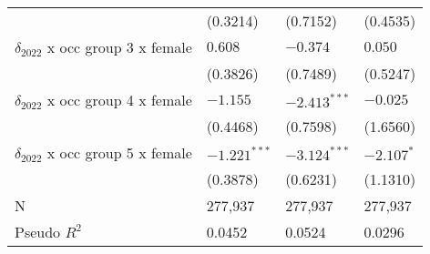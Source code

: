 \begin{tabular}{llll}
                                       &           (0.3214) &           (0.7152) &           (0.4535) \\
$\delta_{2022}$ x occ group 3 x female &            $0.608$ &           $-0.374$ &            $0.050$ \\
                                       &           (0.3826) &           (0.7489) &           (0.5247) \\
$\delta_{2022}$ x occ group 4 x female &           $-1.155$ &     $-2.413^{***}$ &           $-0.025$ \\
                                       &           (0.4468) &           (0.7598) &           (1.6560) \\
$\delta_{2022}$ x occ group 5 x female &     $-1.221^{***}$ &     $-3.124^{***}$ &         $-2.107^*$ \\
                                       &           (0.3878) &           (0.6231) &           (1.1310) \\
\midrule
N                                      &            277,937 &            277,937 &            277,937 \\
Pseudo $R^2$                           &             0.0452 &             0.0524 &             0.0296 \\
\bottomrule
\end{tabular}
